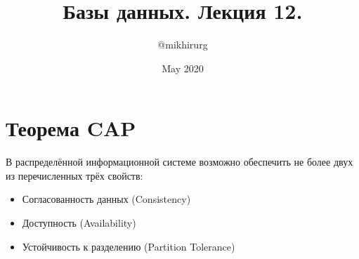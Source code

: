 \documentclass{article}
\title{Базы данных. Лекция 12.}
\author{@mikhirurg }
\date{May 2020}
\begin{document}
\maketitle

\section{Теорема CAP}

В распределённой информационной системе возможно обеспечить не более двух из перечисленных трёх свойств:
\begin{itemize}
    \item Согласованность данных (Consistency)
    \item Доступность (Availability)
    \item Устойчивость к разделению (Partition Tolerance)
\end{itemize}
\end{document}
